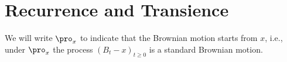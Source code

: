 




\section{Recurrence and Transience}


We will write $\pro_x$ to indicate that the Brownian motion starts from $x$, i.e., under $\pro_x$ the process $(B_t-x)_{t\geq 0}$ is a standard Brownian motion.

